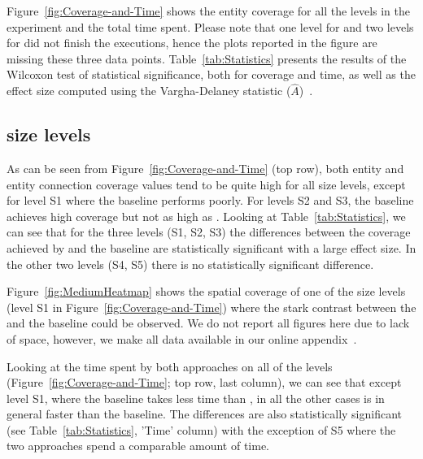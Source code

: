 Figure~\ref{fig:Coverage-and-Time} shows the entity coverage for all the \lr levels in the experiment and the total time spent. Please note that one level for \med and two levels for \ext did not finish the executions, hence the plots reported in the figure are missing these three data points. Table~\ref{tab:Statistics} presents the results of the Wilcoxon test of statistical significance, both for coverage and time, as well as the effect size computed using the Vargha-Delaney statistic ($\hat{A}$)~\cite{DBLP:journals/stvr/ArcuriB14}.

\subsection{\med size levels}
As can be seen from Figure~\ref{fig:Coverage-and-Time} (top row), both entity and entity connection coverage values tend to be quite high for all \med size levels, except for level S1 where the baseline performs poorly. For levels S2 and S3, the baseline achieves high coverage but not as high as \approach. Looking at Table~\ref{tab:Statistics}, we can see that for the three levels (S1, S2, S3) the differences between the coverage achieved by \approach and the baseline are statistically significant with a large effect size. In the other two levels (S4, S5) there is no statistically significant difference.

Figure~\ref{fig:MediumHeatmap} shows the spatial coverage of one of the \med size levels (level S1 in Figure~\ref{fig:Coverage-and-Time}) where the stark contrast between the \approach and the baseline could be observed. We do not report all figures here due to lack of space, however, we make all data available in our online appendix~\cite{online-appendix}.

\begin{figure*}[!htb]
	\hspace*{\fill}%
	\hfill%
	\hspace*{\fill}%
	\caption{Spatial coverage for level S1 of \med size. The darker the color the less explored the area.}
	\label{fig:MediumHeatmap}
\end{figure*}
Looking at the time spent by both approaches on all of the levels (Figure~\ref{fig:Coverage-and-Time}; top row, last column), we can see that except level S1, where the baseline takes less time than \approach, in all the other cases \approach is in general faster than the baseline. The differences are also statistically significant (see Table~\ref{tab:Statistics}, 'Time' column) with the exception of S5 where the two approaches spend a comparable amount of time.

